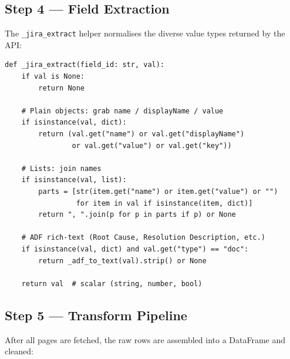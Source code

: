 \documentclass[12pt, a4paper]{article}
\begin{document}
\subsection{Step 4 — Field Extraction}

The \texttt{\_jira\_extract} helper normalises the diverse value types returned by the API:

\begin{lstlisting}[style=python, caption={Field extraction helper (excerpt)}]
def _jira_extract(field_id: str, val):
    if val is None:
        return None

    # Plain objects: grab name / displayName / value
    if isinstance(val, dict):
        return (val.get("name") or val.get("displayName")
                or val.get("value") or val.get("key"))

    # Lists: join names
    if isinstance(val, list):
        parts = [str(item.get("name") or item.get("value") or "")
                 for item in val if isinstance(item, dict)]
        return ", ".join(p for p in parts if p) or None

    # ADF rich-text (Root Cause, Resolution Description, etc.)
    if isinstance(val, dict) and val.get("type") == "doc":
        return _adf_to_text(val).strip() or None

    return val  # scalar (string, number, bool)
\end{lstlisting}

\subsection{Step 5 — Transform Pipeline}

After all pages are fetched, the raw rows are assembled into a DataFrame and cleaned:
\end{document}
